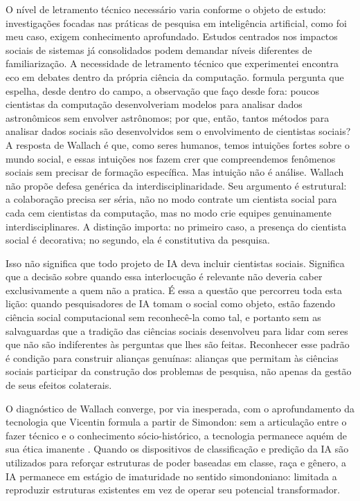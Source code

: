O nível de letramento técnico necessário varia conforme o objeto de estudo: investigações focadas nas práticas de pesquisa em inteligência artificial, como foi meu caso, exigem conhecimento aprofundado. Estudos centrados nos impactos sociais de sistemas já consolidados podem demandar níveis diferentes de familiarização. A necessidade de letramento técnico que experimentei encontra eco em debates dentro da própria ciência da computação. \textcite{Wallach2014} formula pergunta que espelha, desde dentro do campo, a observação que faço desde fora: poucos cientistas da computação desenvolveriam modelos para analisar dados astronômicos sem envolver astrônomos; por que, então, tantos métodos para analisar dados sociais são desenvolvidos sem o envolvimento de cientistas sociais? A resposta de Wallach é que, como seres humanos, temos intuições fortes sobre o mundo social, e essas intuições nos fazem crer que compreendemos fenômenos sociais sem precisar de formação específica. Mas intuição não é análise. Wallach não propõe defesa genérica da interdisciplinaridade. Seu argumento é estrutural: a colaboração precisa ser séria, não no modo contrate um cientista social para cada cem cientistas da computação, mas no modo crie equipes genuinamente interdisciplinares. A distinção importa: no primeiro caso, a presença do cientista social é decorativa; no segundo, ela é constitutiva da pesquisa.

Isso não significa que todo projeto de IA deva incluir cientistas sociais. Significa que a decisão sobre quando essa interlocução é relevante não deveria caber exclusivamente a quem não a pratica. É essa a questão que percorreu toda esta lição: quando pesquisadores de IA tomam o social como objeto, estão fazendo ciência social computacional sem reconhecê-la como tal, e portanto sem as salvaguardas que a tradição das ciências sociais desenvolveu para lidar com seres que não são indiferentes às perguntas que lhes são feitas. Reconhecer esse padrão é condição para construir alianças genuínas: alianças que permitam às ciências sociais participar da construção dos problemas de pesquisa, não apenas da gestão de seus efeitos colaterais.

O diagnóstico de Wallach converge, por via inesperada, com o aprofundamento da tecnologia que Vicentin formula a partir de Simondon: sem a articulação entre o fazer técnico e o conhecimento sócio-histórico, a tecnologia permanece aquém de sua ética imanente \parencite{Vicentin_2022_Esboco}. Quando os dispositivos de classificação e predição da IA são utilizados para reforçar estruturas de poder baseadas em classe, raça e gênero, a IA permanece em estágio de imaturidade no sentido simondoniano: limitada a reproduzir estruturas existentes em vez de operar seu potencial transformador.

